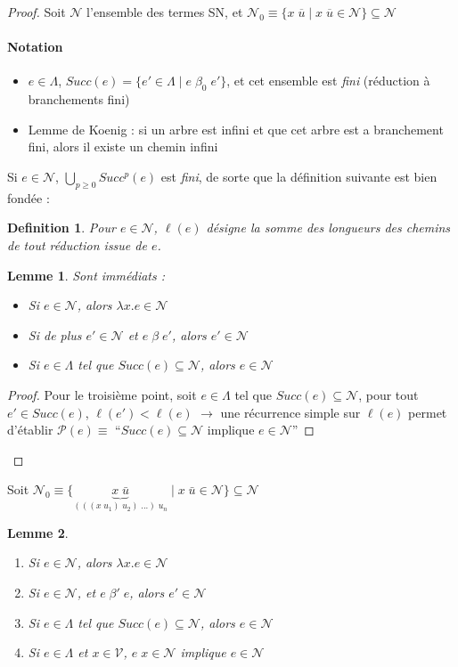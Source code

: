 \documentclass{article}
\newtheorem{lemma}{Lemme}
\newtheorem{defi}{Definition}
\newcommand\lterm[2]{\lambda #1. #2}
\begin{document}
\begin{proof}
Soit $\mathcal{N}$ l'ensemble des termes SN, et $\mathcal{N}_0 \equiv \{  x \; \overline{u} \;|\; x \; \overline{u} \in \mathcal{N}\} \subseteq \mathcal{N}$
\paragraph{Notation}
\begin{itemize}
\item $e\in \Lambda$, $Succ(e)=\{e'\in \Lambda \;|\; e \;\beta_0 \; e' \}$, et cet ensemble est \emph{fini} (réduction à branchements fini)
\item Lemme de Koenig : si un arbre est infini et que cet arbre est a branchement fini, alors il existe un chemin infini
\end{itemize}

Si $e\in \mathcal{N}$, $\bigcup_{p\geq 0} Succ^p (e)$ est \emph{fini}, de sorte que la définition suivante est bien fondée :

\begin{defi}
Pour $e\in \mathcal{N}$, $\ell(e)$ désigne la somme des longueurs des chemins de tout réduction issue de $e$.
\end{defi}

\begin{lemma}
Sont immédiats :
\begin{itemize}
\item Si $e\in \mathcal{N}$, alors $\lterm{x}{e} \in \mathcal{N}$
\item Si de plus $e' \in \mathcal{N}$ et $e \; \beta \; e'$, alors $e' \in \mathcal{N}$
\item Si $e \in \Lambda$ tel que $Succ(e)\subseteq \mathcal{N}$, alors $e\in \mathcal{N}$
\end{itemize}
\end{lemma}
\begin{proof}
Pour le troisième point, soit $e\in \Lambda$ tel que $Succ(e)\subseteq \mathcal{N}$, pour tout $e' \in Succ(e)$, $\ell (e') < \ell(e)$ $\to$ une récurrence simple sur $\ell(e)$ permet d'établir $\mathcal{P}(e) \equiv$ ``$Succ(e) \subseteq \mathcal{N}$ implique $e\in \mathcal{N}$''
\end{proof}

\end{proof}

Soit $\mathcal{N}_0\equiv \{ \underbrace{x\;\bar{u}}_{(((x\; u_1)\; u_2)\; ...)\; u_n} \;|\; x\;\bar{u} \in \mathcal{N} \} \subseteq \mathcal{N}$
\begin{lemma}
\begin{enumerate}[label=\roman*)]
\item Si $e\in \mathcal{N}$, alors $\lterm{x}{e}\in \mathcal{N}$
\item Si $e \in \mathcal{N}$, et $e\; \beta'\; e$, alors $e'\in \mathcal{N}$
\item Si $e \in \Lambda$ tel que $Succ(e)\subseteq \mathcal{N}$, alors $e\in \mathcal{N}$
\item Si $e\in \Lambda$ et $x\in \mathcal{V}$, $e\; x \in \mathcal{N}$ implique $e\in \mathcal{N}$ 
\end{enumerate}
\end{lemma}
\end{document}
